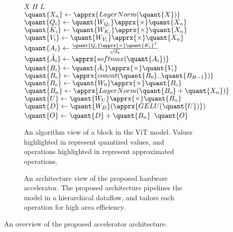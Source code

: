 \begin{figure*}
    \begin{subfigure}[b]{0.3\textwidth}
    \begin{algorithmic}[1] \footnotesize
    \Require $X$ 
    \Require $H$ 
    \Require $L$ 
    \State $\quant{X_n} \gets \apprx{LayerNorm(\quant{X})} $
    \For{$i \in [0, H)$}
    \State $\quant{Q_i} \gets \quant{W_{Q_i}} \apprx{\times} \quant{X_n}$
    \State $\quant{K_i} \gets \quant{W_{K_i}} \apprx{\times} \quant{X_n}$ 
    \State $\quant{V_i} \gets \quant{W_{V_i}} \apprx{\times} \quant{X_n}$ 
    \State $\quant{A_i} \gets \frac{\quant{Q_i} \apprx{\times} \quant{K_i}^T}{\sqrt{d_k}} $
    \State $\quant{\hat{A}_i} \gets \apprx{softmax(\quant{A_i})} $
    \State $\quant{B_i} \gets \quant{\hat{A}_i} \apprx{\times} \quant{V_i}$
    \EndFor
    \State $\quant{B_c} \gets \apprx{concat(\quant{B_0}.. \quant{B_{H-1}})} $
    \State $\quant{B_o} \gets \quant{W_0} \apprx{\times} \quant{B_c}$
    \State $\quant{B_n} \gets \apprx{LayerNorm(\quant{B_o} + \quant{X_n})} $
    \State $\quant{U} \gets \quant{W_U} \apprx{\times} \quant{B_n}$
    \State $\quant{D} \gets \quant{W_D} (\apprx{GELU(\quant{U})})$
    \State $\quant{O} \gets \quant{D} + \quant{B_n}$
    \State \Return $\quant{O}$
    \end{algorithmic}
    \caption{An algorithm view of a block in the ViT model.
    Values highlighted in  represent quantized values, and operations highlighted in  represent approximated operations.}
    \label{fig:motivation}
    \end{subfigure}
    \hfill
    \begin{subfigure}[b]{0.6\textwidth}
    \caption{An architecture view of the proposed hardware accelerator.
    The proposed architecture pipelines the model in a hierarchical dataflow, and tailors each operation for high area efficiency.}
    \label{fig:motivation}
    \end{subfigure}
    \caption{An overview of the proposed accelerator architecture.}
    \label{fig:motivation}
    \end{figure*}
    